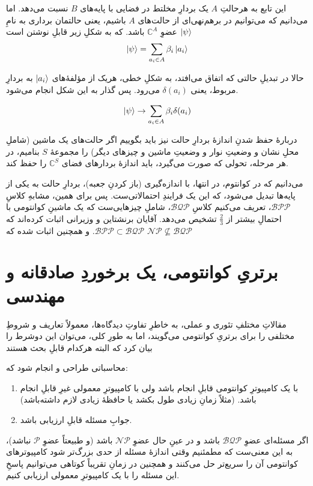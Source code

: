 \documentclass[11pt]{article}
\begin{document}
این تابع به هرحالتِ $A$ یک بردارِ مخلتط در فضایی با پایه‌های $B$ نسبت می‌دهد. اما می‌دانیم که می‌توانیم در برهم‌نهی‌ای از حالت‌های $A$ باشیم، یعنی حالتمان برداری به نامِ $\ket{\psi}$ عضوِ 
$\mathbb{C}^A$ باشد.
که به شکلِ زیر قابلِ نوشتن است
\[ \ket{\psi} = \sum_{a_i \in A} \beta_i \ket{a_i} \]

حالا در تبدیلِ حالتی که اتفاق می‌افتد، به شکلِ خطی، هریک از مؤلفهٔ‌های $\ket{a_i}$ به بردارِ مربوط، یعنی $\delta(a_i)$ می‌رود. پس گذار به این شکل انجام می‌شود.

\[ \ket{\psi} \rightarrow \sum_{a_i \in A} \beta_i \delta(a_i) \]


دربارهٔ حفظ شدنِ اندازهٔ بردارِ حالت نیز باید بگوییم اگر حالت‌های یک ماشین (شاملِ محلِ نشان و وضعیتِ نوار و وضعیتِ ماشین و چیزهای دیگر) را مجموعهٔ $S$ بنامیم، در هر مرحله، تحولی که صورت می‌گیرد، باید اندازهٔ بردارهای فضای 
$\mathbb{C}^S$ 
را حفظ کند.

می‌دانیم که در کوانتوم، در انتها، با اندازه‌گیری (باز کردنِ جعبه)، بردارِ حالت به یکی از پایه‌ها تبدیل می‌شود، که این یک فرایندِ احتمالاتی‌ست. پس برای همین، مشابهِ کلاسِ $\mathcal{BPP}$، تعریف می‌کنیم کلاسِ $\mathcal{BQP}$، شاملِ چیزهایی‌ست که یک ماشینِ کوانتومی با احتمالِ بیشتر از $\frac{2}{3}$ تشخیص می‌دهد. آقایان برنشتاین و وزیرانی اثبات کرده‌اند که 
$\mathcal{BPP} \subset \mathcal{BQP}$.
\cite{bernstein}
 و همچنین اثبات شده که
$\mathcal{NP} \nsubseteq \mathcal{BQP}$
\cite{bennett}

\section{برتریِ کوانتومی، یک برخوردِ‌ صادقانه و مهندسی}

مقالاتِ مختلفِ تئوری \cite{aaronson} و عملی\cite{boxio}، به خاطرِ تفاوتِ دیدگاه‌ها، معمولاً تعاریف و شروطِ مختلفی را برای برتریِ کوانتومی می‌گویند، اما به طورِ کلی، می‌توان این دوشرط را بیان کرد که البته هرکدام قابلِ بحث هستند

محاسباتی طراحی و انجام شود که:
\begin{enumerate}[-]
\item با یک کامپیوترِ کوانتومی قابلِ انجام باشد ولی با کامپیوترِ معمولی غیرِ قابلِ انجام باشد. (مثلاً زمانِ زیادی طول بکشد یا حافظهٔ زیادی لازم داشته‌باشد)
\item جوابِ مسئله قابلِ ارزیابی باشد.
\end{enumerate}

اگر مسئله‌ای عضوِ $\mathcal{BQP}$ باشد و در عینِ حال عضوِ $\mathcal{NP}$ باشد (و طبیعتاً عضوِ $\mathcal{P}$ نباشد)، به این معنی‌ست که مطمئنیم وقتی اندازهٔ مسئله از حدی بزرگ‌تر شود
 کامپیوترهای کوانتومی آن را سریع‌تر حل می‌کنند و همچنین در زمانِ تقریباً کوتاهی می‌توانیم پاسخِ این مسئله را با یک کامپیوترِ معمولی ارزیابی کنیم.
\end{document}
